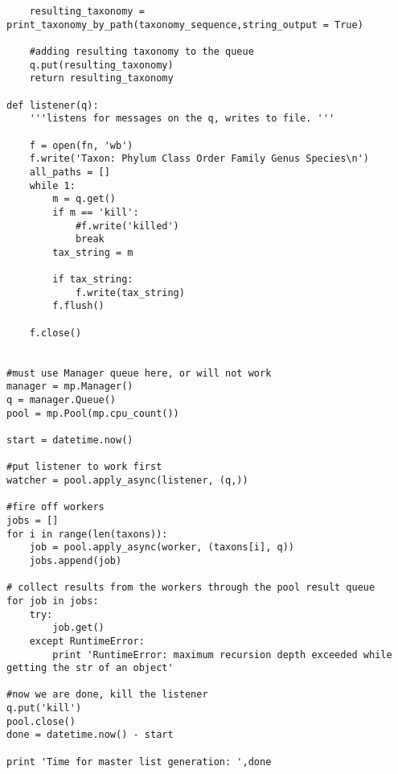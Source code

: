 \documentclass[a4paper,11pt]{article}
\begin{document}
\begin{lstlisting}
    resulting_taxonomy = print_taxonomy_by_path(taxonomy_sequence,string_output = True)
    
    #adding resulting taxonomy to the queue
    q.put(resulting_taxonomy)
    return resulting_taxonomy

def listener(q):
    '''listens for messages on the q, writes to file. '''

    f = open(fn, 'wb') 
    f.write('Taxon: Phylum Class Order Family Genus Species\n')
    all_paths = []
    while 1:
        m = q.get()
        if m == 'kill':
            #f.write('killed')
            break
        tax_string = m
        
        if tax_string:
            f.write(tax_string)
        f.flush()

    f.close()


#must use Manager queue here, or will not work
manager = mp.Manager()
q = manager.Queue()    
pool = mp.Pool(mp.cpu_count())

start = datetime.now()

#put listener to work first
watcher = pool.apply_async(listener, (q,))

#fire off workers
jobs = []
for i in range(len(taxons)):
    job = pool.apply_async(worker, (taxons[i], q))
    jobs.append(job)

# collect results from the workers through the pool result queue
for job in jobs: 
    try:
        job.get()
    except RuntimeError:
        print 'RuntimeError: maximum recursion depth exceeded while getting the str of an object'

#now we are done, kill the listener
q.put('kill')
pool.close()
done = datetime.now() - start

print 'Time for master list generation: ',done
\end{lstlisting}

\clearpage
\end{document}
